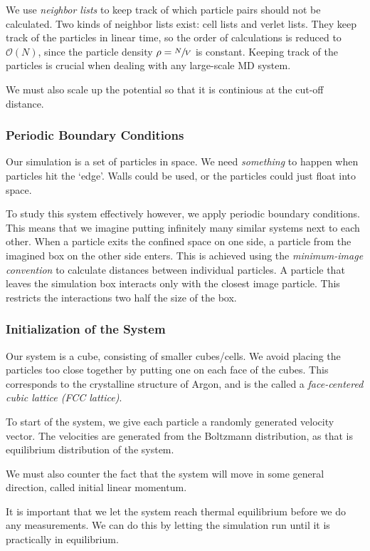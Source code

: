 \documentclass[11pt]{article}
\numberwithin{equation}{section}
\numberwithin{figure}{section}
\newcommand{\mc}[1]{\mathcal{#1}}
\newcommand{\ita}[1]{\textit{#1}}
\begin{document}
We use \ita{neighbor lists} to keep track of which particle
pairs should not be calculated.
Two kinds of neighbor lists exist: cell lists and verlet lists.
They keep track of the particles in linear time,
so the order of calculations is reduced to $\mc O(N)$,
since the particle density $\rho = \sfrac{N}{V}$ is constant.
Keeping track of the particles is crucial when dealing
with any large-scale MD system.

We must also scale up the potential so that it is continious
at the cut-off distance.

\subsubsection{Periodic Boundary Conditions} 

Our simulation is a set of particles in space. 
We need \ita{something} to happen when particles hit the `edge'.
Walls could be used, or the particles could just float into space.

To study this system effectively however, we apply periodic
boundary conditions. This means that we imagine
putting infinitely many similar systems next to each other.
When a particle exits the confined space on one side,
a particle from the imagined box on the other side
enters. This is achieved using the \ita{minimum-image convention}
to calculate distances between individual particles.
A particle that leaves the simulation box interacts only
with the closest image particle. This restricts the
interactions two half the size of the box.

\subsubsection{Initialization of the System} 

Our system is a cube, consisting of smaller cubes/cells.
We avoid placing the particles too close together
by putting one on each face of the cubes.
This corresponds to the crystalline structure of Argon,
and is the called a 
\ita{face-centered cubic lattice (FCC lattice)}.

To start of the system, we give each particle a randomly
generated velocity vector. The velocities are generated
from the Boltzmann distribution, as that is equilibrium
distribution of the system.

We must also counter the fact that the
system will move in some general direction, 
called initial linear momentum.

It is important that we let the system reach
thermal equilibrium before
we do any measurements. We can do this by
letting the simulation run until it is practically in equilibrium.
\end{document}
